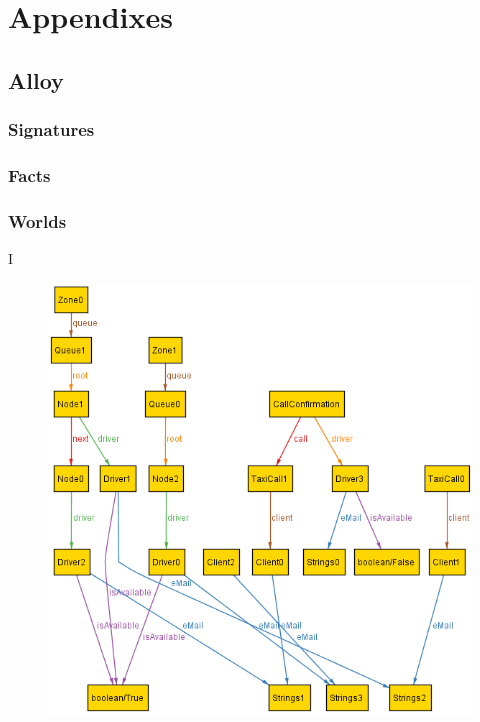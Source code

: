 \documentclass[9pt]{beamer}
\makeatletter
\newcommand*{\currentname}{\@currentlabelname}
\makeatother
\begin{document}
\section{Appendixes}
\subsection{Alloy}
\subsubsection{Signatures}

\begin{frame}[allowframebreaks]{\currentname}

\end{frame}

\subsubsection{Facts}

\begin{frame}[allowframebreaks]{\currentname}

\end{frame}

\subsubsection{Worlds}

\begin{frame}{\currentname{} I}
\begin{figure}[H]
\includegraphics[height=0.8\textheight]{Alloy-Generic}
\centering
\label{fig:alloyworldgeneric}
\end{figure}
\end{frame}
\end{document}
